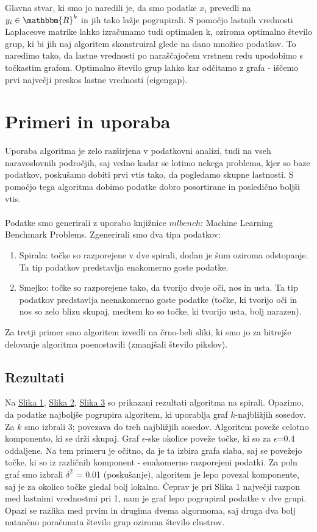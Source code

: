 \documentclass[a4paper, 10pt]{article}
\begin{document}
Glavna stvar, ki smo jo naredili je, da smo podatke $x_i$ prevedli na $y_i\in \mathbbm{R}^{k}$ in jih tako lažje pogrupirali. S pomočjo lastnih vrednosti Laplaceove matrike lahko izračunamo tudi optimalen k, oziroma optimalno število grup, ki bi jih naj algoritem skonstruiral glede na dano množico podatkov. To naredimo tako, da lastne vrednosti po naraščajočem vrstnem redu upodobimo s točkastim grafom. Optimalno število grup lahko kar odčitamo z grafa - iščemo prvi največji preskos lastne vrednosti (eigengap).
\pagebreak 
\section{Primeri in uporaba}

Uporaba algoritma je zelo razširjena v podatkovni analizi, tudi na vseh naravoslovnih
področjih, saj vedno kadar se lotimo nekega problema, kjer so baze
podatkov, poskušamo dobiti prvi vtis tako, da pogledamo skupne lastnosti. S
pomočjo tega algoritma dobimo podatke dobro posortirane in posledično boljši
vtis.\\
\\
Podatke smo generirali z uporabo knjižnice $mlbench$: Machine Learning Benchmark Problems. Zgenerirali smo dva tipa podatkov:
\begin{enumerate}
\item Spirala: točke so razporejene v dve spirali, dodan je šum oziroma odstopanje. Ta tip podatkov predstavlja enakomerno goste podatke.
\item Smejko: točke so razporejene tako, da tvorijo dvoje oči, nos in usta. Ta tip podatkov predstavlja neenakomerno goste podatke (točke, ki tvorijo oči in nos so zelo blizu skupaj, medtem ko so točke, ki tvorijo usta, bolj narazen).
\end{enumerate}
Za tretji primer smo algoritem izvedli na črno-beli sliki, ki smo jo za hitrejše delovanje algoritma poenostavili (zmanjšali število pikslov). 

\subsection{Rezultati}

Na \underline{Slika 1}, \underline{Slika 2}, \underline{Slika 3} so prikazani rezultati algoritma na spirali. Opazimo, da podatke najboljše pogrupira algoritem, ki uporablja graf $k$-najbližjih sosedov. Za $k$ smo izbrali 3; povezava do treh najbližjih sosedov. Algoritem poveže celotno komponento, ki se drži skupaj. Graf $\epsilon$-ske okolice poveže točke, ki so za $\epsilon$=0.4 oddaljene. Na tem primeru je očitno, da je ta izbira grafa slaba, saj se povežejo točke, ki so iz različnih komponent - enakomerno razporejeni podatki. Za poln graf smo izbrali $\delta^2$ = 0.01 (poskušanje), algoritem je lepo povezal komponente, saj je za okolico točke gledal bolj lokalno. Čeprav je pri Slika 1 največji razpon med lastnimi vrednostmi pri 1, nam je graf lepo pogrupiral podatke v dve grupi. Opazi se razlika med prvim in drugima dvema algormoma, saj druga dva bolj natančno poračunata število grup oziroma število clustrov.
\end{document}
